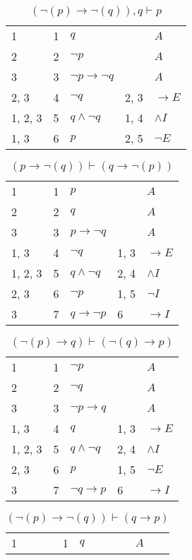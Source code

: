 \documentclass{article}
\begin{document}
\begin{table}[htbp]
\begin{tabular}{lrlll}
\end{tabular}
\end{table}\begin{table}[htbp]\caption*{$(¬(p) → ¬(q)),q ⊢ p$}\centering\begin{tabular}{lrlll}
{1} & 1 & $q$ & {} & $A$ \\
{2} & 2 & $¬p$ & {} & $A$ \\
{3} & 3 & $¬p→ ¬q$ & {} & $A$ \\
{2, 3} & 4 & $¬q$ & {2, 3} & $→E$ \\
{1, 2, 3} & 5 & $q∧ ¬q$ & {1, 4} & $∧I$ \\
{1, 3} & 6 & $p$ & {2, 5} & $¬E$ \\
\end{tabular}
\end{table}\begin{table}[htbp]\caption*{$(p → ¬(q)) ⊢ (q → ¬(p))$}\centering\begin{tabular}{lrlll}
{1} & 1 & $p$ & {} & $A$ \\
{2} & 2 & $q$ & {} & $A$ \\
{3} & 3 & $p→ ¬q$ & {} & $A$ \\
{1, 3} & 4 & $¬q$ & {1, 3} & $→E$ \\
{1, 2, 3} & 5 & $q∧ ¬q$ & {2, 4} & $∧I$ \\
{2, 3} & 6 & $¬p$ & {1, 5} & $¬I$ \\
{3} & 7 & $q→ ¬p$ & {6} & $→I$ \\
\end{tabular}
\end{table}\begin{table}[htbp]\caption*{$(¬(p) → q) ⊢ (¬(q) → p)$}\centering\begin{tabular}{lrlll}
{1} & 1 & $¬p$ & {} & $A$ \\
{2} & 2 & $¬q$ & {} & $A$ \\
{3} & 3 & $¬p→q$ & {} & $A$ \\
{1, 3} & 4 & $q$ & {1, 3} & $→E$ \\
{1, 2, 3} & 5 & $q∧ ¬q$ & {2, 4} & $∧I$ \\
{2, 3} & 6 & $p$ & {1, 5} & $¬E$ \\
{3} & 7 & $¬q→p$ & {6} & $→I$ \\
\end{tabular}
\end{table}\begin{table}[htbp]\caption*{$(¬(p) → ¬(q)) ⊢ (q → p)$}\centering\begin{tabular}{lrlll}
{1} & 1 & $q$ & {} & $A$ \\

\end{tabular}
\end{table}
\end{document}
